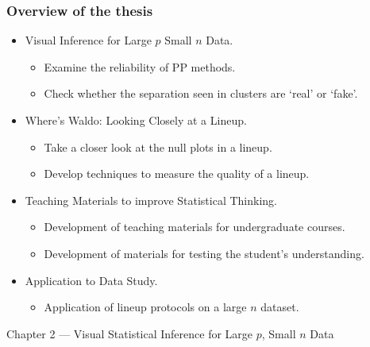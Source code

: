 \documentclass{beamer}
\begin{document}
\begin{frame}
\frametitle{Overview of the thesis}
  \begin{itemize}
    \item Visual Inference for Large $p$ Small $n$ Data.
		  \begin{itemize}
			  \item Examine the reliability of PP methods.
			  \item Check whether the separation seen in clusters are `real' or `fake'.
		  \end{itemize}
    \item Where's Waldo: Looking Closely at a Lineup.
		  \begin{itemize}
			  \item Take a closer look at the null plots in a lineup.
			  \item Develop techniques to measure the quality of a lineup.
		  \end{itemize}	  	  		
    \item Teaching Materials to improve Statistical Thinking.
		  \begin{itemize}
			  \item Development of teaching materials for undergraduate courses. 
			  \item Development of materials for testing the student's understanding.
		  \end{itemize}	  
    \item Application to Data Study.
		  \begin{itemize}
			  \item Application of lineup protocols on a large $n$ dataset.
		  \end{itemize}	    		  		  
  \end{itemize}		  
\end{frame}


\begin{frame}
\begin{block}{}
\begin{center} \Large{Chapter 2 --- Visual Statistical Inference for Large $p$, Small $n$ Data} \end{center}
\end{block}
\end{frame}
\end{document}
